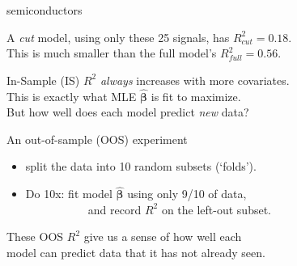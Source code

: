 \documentclass[11pt,xcolor=svgnames]{beamer}
\newcommand{\theme}{\color{Maroon}}
\newcommand{\gr}{\color{black!60}}
\newcommand{\bs}[1]{\boldsymbol{#1}}
\newcommand{\sk}{\vspace{.5cm}}
\begin{document}


\begin{frame}
{semiconductors}

A {\it cut} model, using only these 25  signals,
has $R_{cut}^2 = 0.18$.  \\
This is much smaller than the full model's $R_{full}^2=0.56$.

\sk
In-Sample (IS) $R^2$ {\it always} increases with more covariates.
\\ {\gr This is exactly what MLE $\bs{\hat\beta}$ is fit to maximize.}
\\ {\theme But how well does each model predict {\it new} data?}

\sk
{ An out-of-sample (OOS) experiment}
\begin{itemize}
\item split the data into 10 random subsets {(`folds')}.
\item Do 10x: fit model $\bs{\hat\beta}$ using only 9/10 of data, 
\\ ~~~~~~~~~~~and record $R^2$ on the left-out subset. 
\end{itemize}
These OOS $R^2$ give us a sense of how well each \\model can predict
data that it has not already seen.
\end{frame}
\end{document}

